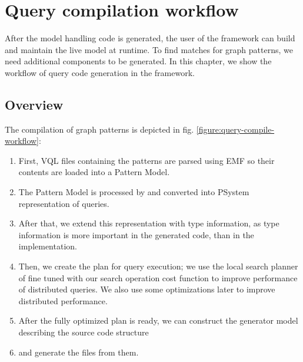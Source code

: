 

\chapter{Query compilation workflow}

After the model handling code is generated, the user of the framework can build and maintain the live model at runtime. 
To find matches for graph patterns, we need additional components to be generated. 
In this chapter, we show the workflow of query code generation in the framework. 

\section{Overview}

The compilation of graph patterns is depicted in fig. \ref{figure:query-compile-workflow}:

\begin{enumerate}[(1)]

\item 
First, VQL files containing the patterns are parsed using EMF so their contents are loaded into a Pattern Model.
\item 
The Pattern Model is processed by \viatra{} and converted into PSystem representation of queries.
\item 
After that, we extend this representation with type information, as type information is more important in the \cpp{} generated code, than in the \viatra{} implementation.
\item 
Then, we create the plan for query execution; we use the local search planner of \viatra{} fine tuned with our search operation cost function to improve performance of distributed queries. 
We also use some optimizations later to improve distributed performance. 
\item 
After the fully optimized plan is ready, we can construct the generator model describing the source code structure 
\item
and generate the \cpp{} files from them.

\end{enumerate}


